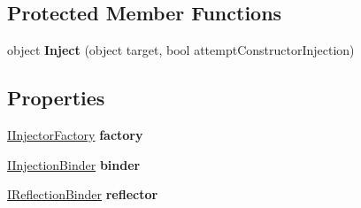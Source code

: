 \subsection*{Protected Member Functions}
\begin{DoxyCompactItemize}
\item 
\hypertarget{classstrange_1_1extensions_1_1injector_1_1impl_1_1_injector_ae6df3d7fb5fc7d18a2ca9c2c8e754783}{object {\bfseries Inject} (object target, bool attempt\-Constructor\-Injection)}\label{classstrange_1_1extensions_1_1injector_1_1impl_1_1_injector_ae6df3d7fb5fc7d18a2ca9c2c8e754783}

\end{DoxyCompactItemize}
\subsection*{Properties}
\begin{DoxyCompactItemize}
\item 
\hypertarget{classstrange_1_1extensions_1_1injector_1_1impl_1_1_injector_a3024581ccae080cd97ef911a10bb647c}{\hyperlink{interfacestrange_1_1extensions_1_1injector_1_1api_1_1_i_injector_factory}{I\-Injector\-Factory} {\bfseries factory}}\label{classstrange_1_1extensions_1_1injector_1_1impl_1_1_injector_a3024581ccae080cd97ef911a10bb647c}

\item 
\hypertarget{classstrange_1_1extensions_1_1injector_1_1impl_1_1_injector_ad39ca1235e74f3ca1b3a32ccc743029c}{\hyperlink{interfacestrange_1_1extensions_1_1injector_1_1api_1_1_i_injection_binder}{I\-Injection\-Binder} {\bfseries binder}}\label{classstrange_1_1extensions_1_1injector_1_1impl_1_1_injector_ad39ca1235e74f3ca1b3a32ccc743029c}

\item 
\hypertarget{classstrange_1_1extensions_1_1injector_1_1impl_1_1_injector_a6c22eb7e1a08cd5261882a0aa7ed7b38}{\hyperlink{interfacestrange_1_1extensions_1_1reflector_1_1api_1_1_i_reflection_binder}{I\-Reflection\-Binder} {\bfseries reflector}}\label{classstrange_1_1extensions_1_1injector_1_1impl_1_1_injector_a6c22eb7e1a08cd5261882a0aa7ed7b38}

\end{DoxyCompactItemize}


